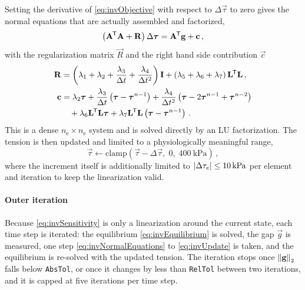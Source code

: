 Setting the derivative of \eqref{eq:invObjective} with respect to $\Delta \vec \tau$ to zero gives the normal equations that are actually assembled and factorized,
\begin{equation}
    \left( \vec A^\tran \vec A + \vec R \right) \Delta \vec \tau = \vec A^\tran \vec g + \vec c \,,
    \label{eq:invNormalEquations}
\end{equation}
with the regularization matrix $\vec R$ and the right hand side contribution $\vec c$
\begin{align}
    \vec R &= \left( \lambda_1 + \lambda_2 + \frac{\lambda_3}{\dt} + \frac{\lambda_4}{\dt^2} \right) \vec I
    + \left( \lambda_5 + \lambda_6 + \lambda_7 \right) \vec L^\tran \vec L \,, \\
    \vec c &= \lambda_2 \vec \tau
    + \frac{\lambda_3}{\dt} \left( \vec \tau - \vec \tau^{n-1} \right)
    + \frac{\lambda_4}{\dt^2} \left( \vec \tau - 2 \vec \tau^{n-1} + \vec \tau^{n-2} \right) \nonumber \\
    &\quad + \lambda_6 \vec L^\tran \vec L \vec \tau
    + \lambda_7 \vec L^\tran \vec L \left( \vec \tau - \vec \tau^{n-1} \right) \,.
\end{align}
This is a dense $n_\mathrm{e} \times n_\mathrm{e}$ system and is solved directly by an LU factorization.
The tension is then updated and limited to a physiologically meaningful range,
\begin{equation}
    \vec \tau \leftarrow \mathrm{clamp} \left( \vec \tau - \Delta \vec \tau, \; 0, \; \SI{400}{\kilo\pascal} \right) \,,
    \label{eq:invUpdate}
\end{equation}
where the increment itself is additionally limited to $\abs{\Delta \tau_e} \leq \SI{10}{\kilo\pascal}$ per element and iteration to keep the linearization valid.

\paragraph{Outer iteration}
Because \eqref{eq:invSensitivity} is only a linearization around the current state, each time step is iterated:
the equilibrium \eqref{eq:invEquilibrium} is solved, the gap $\vec g$ is measured, one step \eqref{eq:invNormalEquations} to \eqref{eq:invUpdate} is taken, and the equilibrium is re-solved with the updated tension.
The iteration stops once $\norm{\vec g}_2$ falls below \verb|AbsTol|, or once it changes by less than \verb|RelTol| between two iterations, and it is capped at five iterations per time step.

